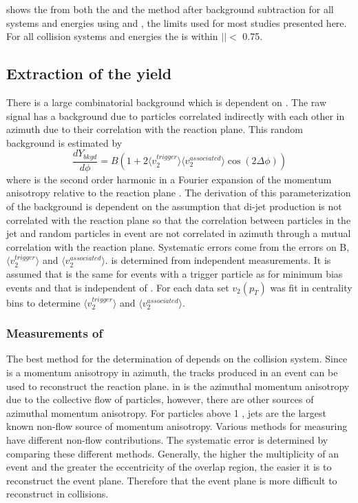  shows the \jlc from both the \dphi and the \deta method after background subtraction for all systems and energies using \stdtrig and \stdassoc, the limits used for most studies presented here.  For all collision systems and energies the \jlc is within $|$\deta$|<$ 0.75.


\subsection{Extraction of the \ridge yield}

There is a large combinatorial background which is dependent on \dphi.  The raw signal has a background due to particles correlated indirectly with each other in azimuth due to their correlation with the reaction plane. This random background is estimated by
\begin{equation}
\frac{dY_{bkgd}}{d\phi} = B (1 + 2 \langle v_2^{trigger}\rangle \langle v_2^{associated}\rangle \cos(2\Delta\phi) )\label{bkgdeqtn}
\end{equation}
where \vtwo is the second order harmonic in a Fourier expansion of the momentum anisotropy relative to the reaction plane \cite{Bielcikova:2003ku}.  The derivation of this parameterization of the background is dependent on the assumption that di-jet production is not correlated with the reaction plane so that the correlation between particles in the jet and random particles in event are not correlated in azimuth through a mutual correlation with the reaction plane.  Systematic errors come from the errors on B, $\langle v_2^{trigger}\rangle$ and $\langle v_2^{associated}\rangle$.  \vtwo is determined from independent measurements.  It is assumed that \vtwo is the same for events with a trigger particle as for minimum bias events and that \vtwo is independent of \deta.  For each data set $v_2(p_T)$ was fit in centrality bins to determine $\langle v_2^{trigger}\rangle$ and $\langle v_2^{associated}\rangle$.


\subsubsection{Measurements of \vtwo}
The best method for the determination of \vtwo depends on the collision system.  Since \vtwo is a momentum anisotropy in azimuth, the tracks produced in an event can be used to reconstruct the reaction plane.  \vtwo in  is the azimuthal momentum anisotropy due to the collective flow of particles, however, there are other sources of azimuthal momentum anisotropy.  For particles above 1 \GeV, jets are the largest known non-flow source of momentum anisotropy.  Various methods for measuring \vtwo have different non-flow contributions.  The systematic error is determined by comparing these different methods.  Generally, the higher the multiplicity of an event and the greater the eccentricity of the overlap region, the easier it is to reconstruct the event plane.  Therefore that the event plane is more difficult to reconstruct in \Cu collisions.

